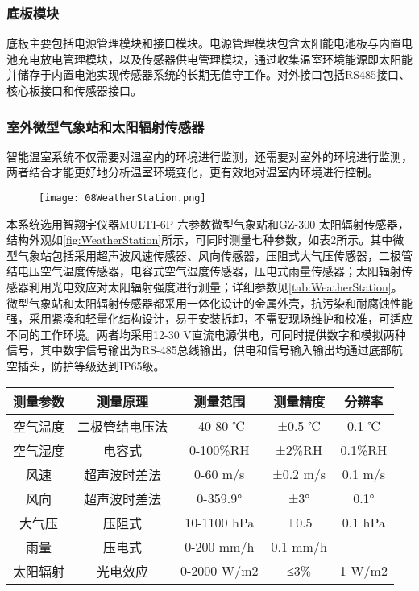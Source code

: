 		\subsubsection{底板模块}
		底板主要包括电源管理模块和接口模块。电源管理模块包含太阳能电池板与内置电池充电放电管理模块，以及传感器供电管理模块，通过收集温室环境能源即太阳能并储存于内置电池实现传感器系统的长期无值守工作。对外接口包括RS485接口、核心板接口和传感器接口。	
		
		\subsubsection{室外微型气象站和太阳辐射传感器}
		智能温室系统不仅需要对温室内的环境进行监测，还需要对室外的环境进行监测，两者结合才能更好地分析温室环境变化，更有效地对温室内环境进行控制。
  		\begin{figure}[!htp]
  			\centering
 			\texttt{[image: 08WeatherStation.png]}
		\end{figure}
		本系统选用智翔宇仪器MULTI-6P 六参数微型气象站和GZ-300 太阳辐射传感器，结构外观如\ref{fig:WeatherStation}所示，可同时测量七种参数，如表2所示。其中微型气象站包括采用超声波风速传感器、风向传感器，压阻式大气压传感器，二极管结电压空气温度传感器，电容式空气湿度传感器，压电式雨量传感器；太阳辐射传感器利用光电效应对太阳辐射强度进行测量；详细参数见\ref{tab:WeatherStation}。微型气象站和太阳辐射传感器都采用一体化设计的金属外壳，抗污染和耐腐蚀性能强，采用紧凑和轻量化结构设计，易于安装拆卸，不需要现场维护和校准，可适应不同的工作环境。两者均采用12-30 V直流电源供电，可同时提供数字和模拟两种信号，其中数字信号输出为RS-485总线输出，供电和信号输入输出均通过底部航空插头，防护等级达到IP65级。
		
		\begin{table}[!hpb]
  			\centering
  			\begin{tabular}{ccccc} \toprule
			测量参数 & 测量原理 & 测量范围 & 测量精度 & 分辨率\\ \midrule
			空气温度 & 二极管结电压法 & -40-80 ℃ &	±0.5 ℃ &	0.1 ℃\\
			空气湿度 & 电容式 & 0-100\%RH & ±2\%RH & 0.1\%RH\\
			风速 & 超声波时差法 & 0-60 m/s & ±0.2 m/s & 0.1 m/s\\
			风向 & 超声波时差法 & 0-359.9° & ±3° & 0.1°\\
			大气压 & 压阻式 & 10-1100 hPa	 & ±0.5	 & 0.1 hPa\\
			雨量 & 压电式 & 0-200 mm/h	 & 	0.1 mm/h\\
			太阳辐射 & 光电效应 & 0-2000 W/m2 & ≤3\% & 	1 W/m2\\ \bottomrule
 			\end{tabular}
		\end{table}

